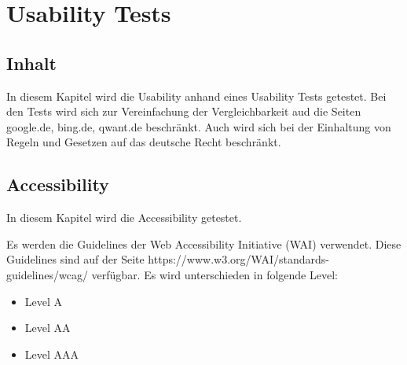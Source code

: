 \section{Usability Tests}\label{sec:usability}

\subsection{Inhalt}\label{subsec:inhalt}
In diesem Kapitel wird die Usability anhand eines Usability Tests getestet.
Bei den Tests wird sich zur Vereinfachung der Vergleichbarkeit aud die Seiten google.de, bing.de, qwant.de beschränkt.
Auch wird sich bei der Einhaltung von Regeln und Gesetzen auf das deutsche Recht beschränkt.

\subsection{Accessibility}\label{subsec:accessibility}
In diesem Kapitel wird die Accessibility getestet.

Es werden die Guidelines der Web Accessibility Initiative (WAI) verwendet.
Diese Guidelines sind auf der Seite https://www.w3.org/WAI/standards-guidelines/wcag/ verfügbar.
Es wird unterschieden in folgende Level:
\begin{itemize}
\item Level A
\item Level AA
\item Level AAA
\end{itemize}\cite{WCAG21}